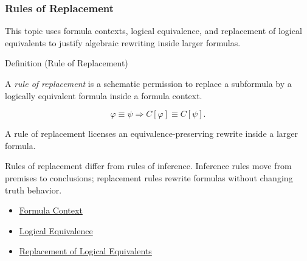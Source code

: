 \subsubsection*{Rules of Replacement}

\begin{remark*}
This topic uses formula contexts, logical equivalence, and replacement of
logical equivalents to justify algebraic rewriting inside larger formulas.
\end{remark*}

\begin{definitionbox}{Definition (Rule of Replacement)}
\begin{definition}
\label{def:rule-of-replacement-propositional-logic}
A \emph{rule of replacement} is a schematic permission to replace a subformula
by a logically equivalent formula inside a formula context.
\end{definition}
\end{definitionbox}

\begin{remark*}
\[
\varphi\equiv\psi
\Longrightarrow
C[\varphi]\equiv C[\psi].
\]
\end{remark*}



\begin{remark*}[Interpretation]
A rule of replacement licenses an equivalence-preserving rewrite inside a larger
formula.

Rules of replacement differ from rules of inference. Inference rules move from
premises to conclusions; replacement rules rewrite formulas without changing
truth behavior.
\end{remark*}

\begin{dependencies}
\begin{itemize}
  \item \hyperref[def:formula-context-propositional-logic]{Formula Context}
  \item \hyperref[def:logical-equivalence-propositional-logic]{Logical Equivalence}
  \item \hyperref[thm:replacement-of-logical-equivalents-propositional-logic]{Replacement of Logical Equivalents}
\end{itemize}
\end{dependencies}

